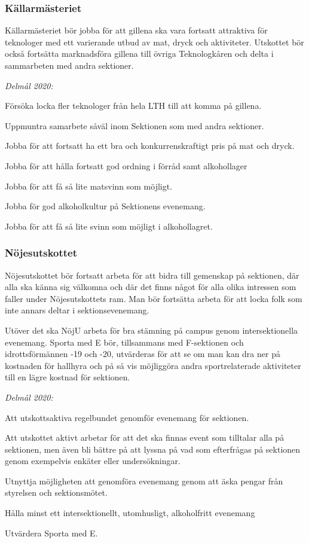 \documentclass[../_main/handlingar.tex]{subfiles}
\begin{document}
\subsubsection*{Källarmästeriet}
Källarmästeriet bör jobba för att gillena ska vara fortsatt attraktiva för teknologer med ett varierande utbud av mat, dryck och aktiviteter. Utskottet bör också fortsätta marknadsföra gillena till övriga Teknologkåren och delta i sammarbeten med andra sektioner.

\emph{Delmål 2020:}
\begin{dashlist}
	\item Försöka locka fler teknologer från hela LTH till att komma på gillena.
	\item Uppmuntra samarbete såväl inom Sektionen som med andra sektioner.
	\item Jobba för att fortsatt ha ett bra och konkurrenskraftigt pris på mat och dryck.
	\item Jobba för att hålla fortsatt god ordning i förråd samt alkohollager
	\item Jobba för att få så lite matsvinn som möjligt.
	\item Jobba för god alkoholkultur på Sektionens evenemang.
	\item Jobba för att få så lite svinn som möjligt i alkohollagret.
\end{dashlist}
\newpage
\subsubsection*{Nöjesutskottet}
Nöjesutskottet bör fortsatt arbeta för att bidra till gemenskap på sektionen, där alla ska känna sig välkomna och där det finns något för alla olika intressen som faller under Nöjesutskottets ram. Man bör fortsätta arbeta för att locka folk som inte annars deltar i sektionsevenemang. 

Utöver det ska NöjU arbeta för bra stämning på campus genom intersektionella evenemang. Sporta med E bör, tillsammans med F-sektionen och idrottsförmännen -19 och -20, utvärderas för att se om man kan dra ner på kostnaden för hallhyra och på så vis möjliggöra andra sportrelaterade aktiviteter till en lägre kostnad för sektionen.  


\emph{Delmål 2020:}
\begin{dashlist}
	\item Att utskottsaktiva regelbundet genomför evenemang för sektionen.
	\item Att utskottet aktivt arbetar för att det ska finnas event som tilltalar alla på sektionen, men även bli bättre på att lyssna på vad som efterfrågas på sektionen genom exempelvis enkäter eller undersökningar.
	\item Utnyttja möjligheten att genomföra evenemang genom att äska pengar från styrelsen och sektionsmötet.
	\item Hålla minst ett intersektionellt, utomhusligt, alkoholfritt evenemang
	\item Utvärdera Sporta med E.
\end{dashlist}
\end{document}
